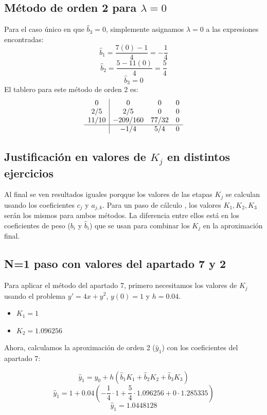 \documentclass{article}
\begin{document}
\subsection{Método de orden 2 para $\lambda = 0$}

Para el caso único en que $\hat{b}_3 = 0$, simplemente asignamos $\lambda = 0$ a las expresiones encontradas:
$$
\hat{b}_{1} = \frac{7(0) - 1}{4} = -\frac{1}{4}
$$
$$
\hat{b}_{2} = \frac{5 - 11(0)}{4} = \frac{5}{4}
$$
$$
\hat{b}_{3} = 0
$$
El tablero para este método de orden 2 es:
$$
\begin{array}{c|ccc}
0 & 0 & 0 & 0 \\
2/5 & 2/5 & 0 & 0 \\
11/10 & -209/160 & 77/32 & 0 \\
\hline
& -1/4 & 5/4 & 0
\end{array}
$$

\subsection{Justificación en valores de $K_j$ en distintos ejercicios}

Al final se ven resultados iguales porqque los valores de las etapas $K_j$ se calculan usando los coeficientes $c_j$ y $a_{j,k}$. Para un paso de cálculo , los valores $K_1, K_2, K_3$ serán los mismos para ambos métodos. La diferencia entre ellos está en los coeficientes de peso ($b_i$ y $\hat{b}_i$) que se usan para combinar los $K_j$ en la aproximación final.


\subsection{N=1 paso con valores del apartado 7 y 2}

Para aplicar el método del apartado 7, primero necesitamos los valores de $K_j$ usando el problema $y'=4x+y^2$, $y(0)=1$ y $h=0.04$.
\begin{itemize}
    \item $K_1 = 1$
    \item $K_2 = 1.096256$
\end{itemize}

Ahora, calculamos la aproximación de orden 2 ($\hat{y}_1$) con los coeficientes del apartado 7:

$$
\hat{y}_1 = y_0 + h (\hat{b}_1 K_1 + \hat{b}_2 K_2 + \hat{b}_3 K_3)
$$
$$
\hat{y}_1 = 1 + 0.04 \left( -\frac{1}{4} \cdot 1 + \frac{5}{4} \cdot 1.096256 + 0 \cdot 1.285335 \right)
$$
$$
\hat{y}_1 = \boxed{1.0448128}
$$
\end{document}
